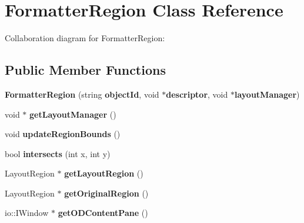 \section{FormatterRegion Class Reference}
\label{classbr_1_1pucrio_1_1telemidia_1_1ginga_1_1ncl_1_1model_1_1presentation_1_1FormatterRegion}
Collaboration diagram for FormatterRegion:\subsection*{Public Member Functions}
\begin{CompactItemize}
\item 
\textbf{FormatterRegion} (string {\bf objectId}, void $\ast${\bf descriptor}, void $\ast${\bf layoutManager})\label{classbr_1_1pucrio_1_1telemidia_1_1ginga_1_1ncl_1_1model_1_1presentation_1_1FormatterRegion_89438fa2c89731171ae1cc38c34342cf}

\item 
void $\ast$ \textbf{getLayoutManager} ()\label{classbr_1_1pucrio_1_1telemidia_1_1ginga_1_1ncl_1_1model_1_1presentation_1_1FormatterRegion_57d38bf54b62db76481174eefbfcca68}

\item 
void \textbf{updateRegionBounds} ()\label{classbr_1_1pucrio_1_1telemidia_1_1ginga_1_1ncl_1_1model_1_1presentation_1_1FormatterRegion_feb6ef84bebe5a108b7549030f5e3fb7}

\item 
bool \textbf{intersects} (int x, int y)\label{classbr_1_1pucrio_1_1telemidia_1_1ginga_1_1ncl_1_1model_1_1presentation_1_1FormatterRegion_c6ef8bf339f1878db865dd518da2bc8b}

\item 
LayoutRegion $\ast$ \textbf{getLayoutRegion} ()\label{classbr_1_1pucrio_1_1telemidia_1_1ginga_1_1ncl_1_1model_1_1presentation_1_1FormatterRegion_e2dba952ec39c9bc25a506d866cc0dfc}

\item 
LayoutRegion $\ast$ \textbf{getOriginalRegion} ()\label{classbr_1_1pucrio_1_1telemidia_1_1ginga_1_1ncl_1_1model_1_1presentation_1_1FormatterRegion_04bf9326c5a6795db41d52893c93ccf2}

\item 
io::IWindow $\ast$ \textbf{getODContentPane} ()\label{classbr_1_1pucrio_1_1telemidia_1_1ginga_1_1ncl_1_1model_1_1presentation_1_1FormatterRegion_34bd628ba95a2253e36fb5aa45f6f60a}


\end{CompactItemize}
